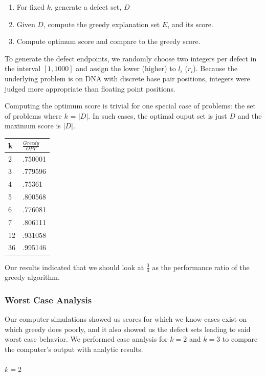 \documentclass[11pt,twocolumn]{article}
\begin{document}
\begin{enumerate}
\item For fixed $k$, generate a defect set, $D$
\item Given $D$, compute the greedy explanation set $E$, and its score.
\item Compute optimum score and compare to the greedy score.
\end{enumerate}

To generate the defect endpoints, we randomly choose two integers per defect in the interval $[1,1000]$ and assign the lower (higher) to $l_i$ ($r_i$).  Because the underlying problem is on DNA with discrete base pair positions, integers were judged more appropriate than floating point positions.

Computing the optimum score is trivial for one special case of problems: the set of problems where $k$ = $|D|$.  In such cases, the optimal ouput set is just $D$ and the maximum score is $|D|$.  

\begin{tabular}{l|l}
k & $\frac{Greedy}{OPT}$ \\ \hline
 2 & .750001  \\
 3 & .779596  \\
 4 & .75361   \\
 5 & .800568  \\
 6 & .776081  \\
 7 & .806111  \\
12 & .931058  \\
36 & .995146  \\
\end{tabular}

Our results indicated that we should look at $\frac34$ as the performance ratio of the greedy algorithm.

\subsubsection{Worst Case Analysis}

Our computer simulations showed us scores for which we know cases exist on which greedy does poorly, and it also showed us the defect sets leading to said worst case behavior.  We performed case analysis for $k=2$ and $k=3$ to compare the computer's output with analytic results.

\paragraph{\textbf{$k=2$}} 
\end{document}
